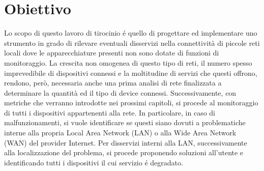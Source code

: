 









\section{Obiettivo}

Lo scopo di questo lavoro di tirocinio \'e quello di progettare ed implementare uno strumento in grado di rilevare eventuali disservizi nella connettivit\`a di piccole reti locali dove le apparecchiature presenti non sono dotate di funzioni di monitoraggio.
La crescita non omogenea di questo tipo di reti, il numero spesso imprevedibile di dispositivi connessi e la moltitudine di servizi che questi offrono, rendono, per\`o, necessaria anche una prima analisi di rete finalizzata a determinare la quantit\`a ed il tipo di device connessi.
Successivamente, con metriche che verranno introdotte nei prossimi capitoli, si procede al monitoraggio di tutti i dispositivi appartenenti alla rete. 
In particolare, in caso di malfunzionamenti, si vuole identificare se questi siano dovuti a problematiche interne alla propria Local Area Network (LAN) o alla Wide Area Network (WAN) del provider Internet.
Per disservizi interni alla LAN, successivamente alla localizzazione del problema, si procede proponendo soluzioni all'utente e identificando tutti i dispositivi il cui servizio \'e degradato.

